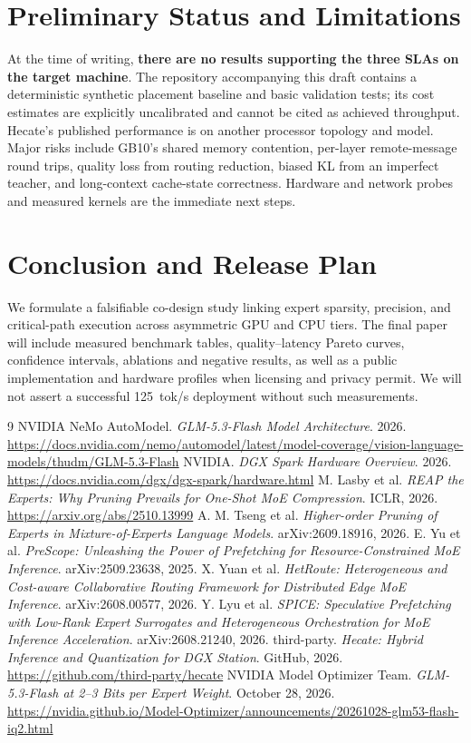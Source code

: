 \documentclass[10pt,twocolumn]{article}
\begin{document}
\section{Preliminary Status and Limitations}
At the time of writing, \textbf{there are no results supporting the three SLAs on the target machine}. The repository accompanying this draft contains a deterministic synthetic placement baseline and basic validation tests; its cost estimates are explicitly uncalibrated and cannot be cited as achieved throughput. Hecate's published performance is on another processor topology and model. Major risks include GB10's shared memory contention, per-layer remote-message round trips, quality loss from routing reduction, biased KL from an imperfect teacher, and long-context cache-state correctness. Hardware and network probes and measured kernels are the immediate next steps.

\section{Conclusion and Release Plan}
We formulate a falsifiable co-design study linking expert sparsity, precision, and critical-path execution across asymmetric GPU and CPU tiers. The final paper will include measured benchmark tables, quality--latency Pareto curves, confidence intervals, ablations and negative results, as well as a public implementation and hardware profiles when licensing and privacy permit. We will not assert a successful 125~tok/s deployment without such measurements.

\begin{thebibliography}{9}\small
{} NVIDIA NeMo AutoModel. \emph{GLM-5.3-Flash Model Architecture}. 2026. \url{https://docs.nvidia.com/nemo/automodel/latest/model-coverage/vision-language-models/thudm/GLM-5.3-Flash}
 NVIDIA. \emph{DGX Spark Hardware Overview}. 2026. \url{https://docs.nvidia.com/dgx/dgx-spark/hardware.html}
 M. Lasby et al. \emph{REAP the Experts: Why Pruning Prevails for One-Shot MoE Compression}. ICLR, 2026. \url{https://arxiv.org/abs/2510.13999}
 A. M. Tseng et al. \emph{Higher-order Pruning of Experts in Mixture-of-Experts Language Models}. arXiv:2609.18916, 2026.
 E. Yu et al. \emph{PreScope: Unleashing the Power of Prefetching for Resource-Constrained MoE Inference}. arXiv:2509.23638, 2025.
 X. Yuan et al. \emph{HetRoute: Heterogeneous and Cost-aware Collaborative Routing Framework for Distributed Edge MoE Inference}. arXiv:2608.00577, 2026.
 Y. Lyu et al. \emph{SPICE: Speculative Prefetching with Low-Rank Expert Surrogates and Heterogeneous Orchestration for MoE Inference Acceleration}. arXiv:2608.21240, 2026.
 third-party. \emph{Hecate: Hybrid Inference and Quantization for DGX Station}. GitHub, 2026. \url{https://github.com/third-party/hecate}
 NVIDIA Model Optimizer Team. \emph{GLM-5.3-Flash at 2--3 Bits per Expert Weight}. October 28, 2026. \url{https://nvidia.github.io/Model-Optimizer/announcements/20261028-glm53-flash-iq2.html}
\end{thebibliography}
\end{document}

